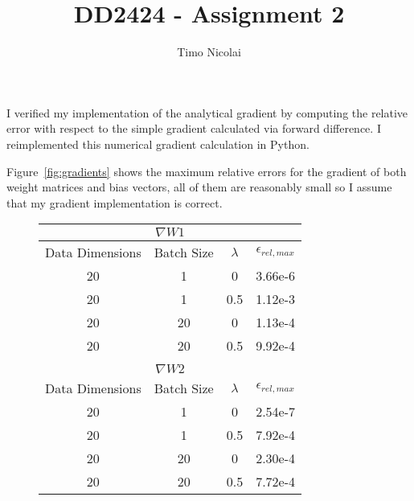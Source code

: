 \documentclass{article}
\begin{document}
\title{DD2424 - Assignment 2}
\author{Timo Nicolai}

\maketitle

\noindent
I verified my implementation of the analytical gradient by computing the relative
error with respect to the simple gradient calculated via forward difference.
I reimplemented this numerical gradient calculation in Python.

Figure~\ref{fig:gradients} shows the maximum relative errors for the gradient
of both weight matrices and bias vectors, all of them are reasonably small so
I assume that my gradient implementation is correct.

\begin{figure}[H]
  \centering
    \footnotesize
    \begin{tabular}{|c|c|c|c|}
    \multicolumn{4}{c}{$\nabla W1$}                                 \\
    \hline
    Data Dimensions & Batch Size & $\lambda$ & $\epsilon_{rel,max}$ \\
    \hline
    20              & 1          & 0         & 3.66e-6              \\
    \hline
    20              & 1          & 0.5       & 1.12e-3              \\
    \hline
    20              & 20         & 0         & 1.13e-4              \\
    \hline
    20              & 20         & 0.5       & 9.92e-4              \\
    \hline

    \multicolumn{4}{c}{}                                            \\

    \multicolumn{4}{c}{$\nabla W2$}                                 \\
    \hline
    Data Dimensions & Batch Size & $\lambda$ & $\epsilon_{rel,max}$ \\
    \hline
    20              & 1          & 0         & 2.54e-7              \\
    \hline
    20              & 1          & 0.5       & 7.92e-4              \\
    \hline
    20              & 20         & 0         & 2.30e-4              \\
    \hline
    20              & 20         & 0.5       & 7.72e-4              \\
    \hline


\end{tabular}
\end{figure}
\end{document}
